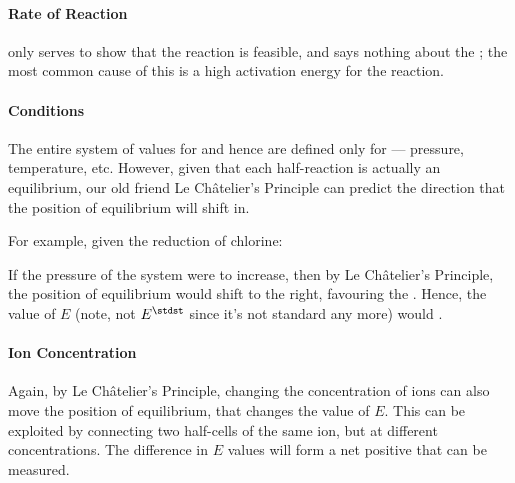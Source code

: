 				\paragraph{Rate of Reaction}

				\Ecell{} only serves to show that the reaction is feasible, and says nothing about the ;
				the most common cause of this is a high activation energy for the reaction.


				\paragraph{Conditions}

				The entire system of values for \Eo{} and hence \Ecell{} are defined only for  --- pressure,
				temperature, etc. However, given that each half-reaction is actually an equilibrium, our old friend Le Châtelier's Principle
				can predict the direction that the position of equilibrium will shift in.

				For example, given the reduction of chlorine:


				If the pressure of the system were to increase, then by Le Châtelier's Principle, the position of equilibrium would shift to
				the right, favouring the . Hence, the value of $E$ (note, not $E^{\stdst}$ since it's
				not standard any more) would .



				\paragraph{Ion Concentration}

				Again, by Le Châtelier's Principle, changing the concentration of ions can also move the position of equilibrium, that changes
				the value of $E$. This can be exploited by connecting two half-cells of the same ion, but at different concentrations. The
				difference in $E$ values will form a net positive \Ecell{} that can be measured.



